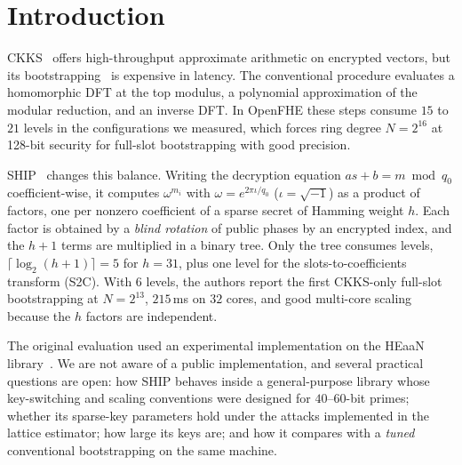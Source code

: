 \documentclass[sigconf,nonacm]{acmart}
\begin{document}

\maketitle

\section{Introduction}

CKKS~\cite{CKKS17} offers high-throughput approximate arithmetic on encrypted vectors, but its bootstrapping~\cite{CHKKS18} is expensive in latency.
The conventional procedure evaluates a homomorphic DFT at the top modulus, a polynomial approximation of the modular reduction, and an inverse DFT.
In OpenFHE these steps consume $15$ to $21$ levels in the configurations we measured, which forces ring degree $N=2^{16}$ at 128-bit security for full-slot bootstrapping with good precision.

SHIP~\cite{CHKS25} changes this balance.
Writing the decryption equation $a s + b = m \bmod q_0$ coefficient-wise, it computes $\omega^{m_i}$ with $\omega=e^{2\pi\iota/q_0}$ ($\iota=\sqrt{-1}$) as a product of factors, one per nonzero coefficient of a sparse secret of Hamming weight $h$.
Each factor is obtained by a \emph{blind rotation} of public phases by an encrypted index, and the $h+1$ terms are multiplied in a binary tree.
Only the tree consumes levels, $\lceil\log_2(h+1)\rceil=5$ for $h=31$, plus one level for the slots-to-coefficients transform (S2C).
With $6$ levels, the authors report the first CKKS-only full-slot bootstrapping at $N=2^{13}$, $215$\,ms on $32$ cores, and good multi-core scaling because the $h$ factors are independent.

The original evaluation used an experimental implementation on the HEaaN library~\cite{HEaaN}.
We are not aware of a public implementation, and several practical questions are open: how SHIP behaves inside a general-purpose library whose key-switching and scaling conventions were designed for $40$--$60$-bit primes; whether its sparse-key parameters hold under the attacks implemented in the lattice estimator; how large its keys are; and how it compares with a \emph{tuned} conventional bootstrapping on the same machine.
\end{document}
